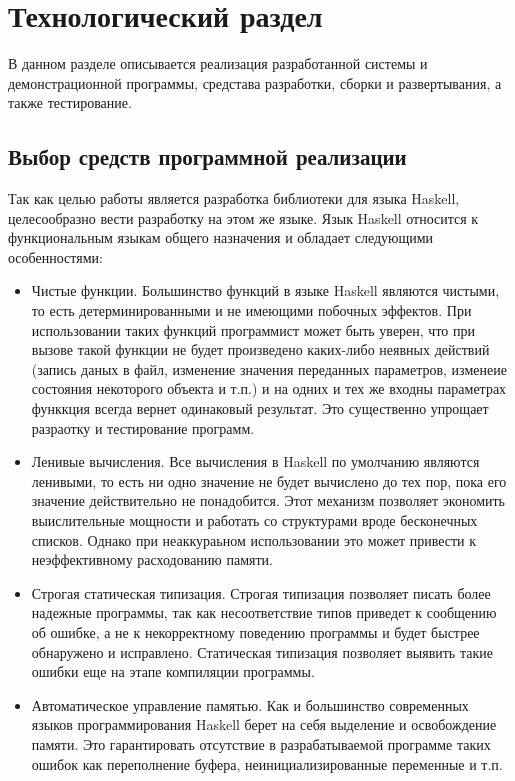 \chapter{Технологический раздел}

В данном разделе описывается реализация разработанной системы и демонстрационной программы, средстава разработки, сборки и развертывания, а также тестирование.

\section{Выбор средств программной реализации}

Так как целью работы является разработка библиотеки для языка Haskell, целесообразно вести разработку на этом же языке. Язык Haskell относится к функциональным языкам общего назначения и обладает следующими особенностями:

\begin{itemize}
\item Чистые функции. Большинство функций в языке Haskell являются чистыми, то есть детерминированными и не имеющими побочных эффектов. При использовании таких функций программист может быть уверен, что при вызове такой функции не будет произведено каких-либо неявных действий (запись даных в файл, изменение значения переданных параметров, изменеие состояния некоторого объекта и т.п.) и на одних и тех же входны параметрах функкция всегда вернет одинаковый результат. Это существенно упрощает разраотку и тестирование программ.

\item Ленивые вычисления. Все вычисления в Haskell по умолчанию являются ленивыми, то есть ни одно значение не будет вычислено до тех пор, пока его значение действительно не понадобится. Этот механизм позволяет экономить выислительные мощности и работать со структурами вроде бесконечных списков. Однако при неаккураьном использовании это может привести к неэффективному расходованию памяти.

\item Строгая статическая типизация. Строгая типизация позволяет писать более надежные программы, так как несоответствие типов приведет к сообщению об ошибке, а не к некорректному поведению программы и будет быстрее обнаружено и исправлено. Статическая типизация позволяет выявить такие ошибки еще на этапе компиляции программы.

\item Автоматическое управление памятью. Как и большинство современных языков программирования Haskell берет на себя выделение и освобождение памяти. Это гарантировать отсутствие в разрабатываемой программе таких ошибок как переполнение буфера, неинициализированные переменные и т.п.

\end{itemize}

